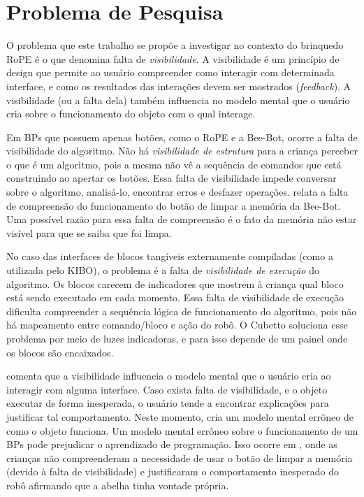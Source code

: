 \section{Problema de Pesquisa} \label{s_cintro_problema_pesquisa}

O problema que este trabalho se propõe a investigar no contexto do brinquedo RoPE é o que  denomina falta de \textit{visibilidade}. A visibilidade é um princípio de design que permite ao usuário compreender como interagir com determinada interface, e como os resultados das interações devem ser mostrados (\textit{feedback}). A visibilidade (ou a falta dela) também influencia no modelo mental que o usuário cria sobre o funcionamento do objeto com o qual interage.

Em BPs que possuem apenas botões, como o RoPE e a Bee-Bot, ocorre a falta de visibilidade do algoritmo. Não há \textit{visibilidade de estrutura} para a criança perceber o que é um algoritmo, pois a mesma não vê a sequência de comandos que está construindo ao apertar os botões. Essa falta de visibilidade impede conversar sobre o algoritmo, analisá-lo, encontrar erros e desfazer operações.  relata a falta de compreensão do funcionamento do botão de limpar a memória da Bee-Bot. Uma possível razão para essa falta de compreensão é o fato da memória não estar visível para que se saiba que foi limpa.

No caso das interfaces de blocos tangíveis externamente compiladas (como a utilizada pelo KIBO), o problema é a falta de \textit{visibilidade de execução} do algoritmo. Os blocos carecem de indicadores que mostrem à criança qual bloco está sendo executado em cada momento. Essa falta de visibilidade de execução dificulta compreender a sequência lógica de funcionamento do algoritmo, pois não há mapeamento entre comando/bloco e ação do robô. O Cubetto soluciona esse problema por meio de luzes indicadoras, e para isso depende de um painel onde os blocos são encaixados.

 comenta que a visibilidade influencia o modelo mental que o usuário cria ao interagir com alguma interface. Caso exista falta de visibilidade, e o objeto executar de forma inesperada, o usuário tende a encontrar explicações para justificar tal comportamento. Neste momento, cria um modelo mental errôneo de como o objeto funciona. Um modelo mental errôneo sobre o funcionamento de um BPs pode prejudicar o aprendizado de programação. Isso ocorre em , onde as crianças não compreenderam a necessidade de usar o botão de limpar a memória (devido à falta de visibilidade) e justificaram o comportamento inesperado do robô afirmando que a abelha tinha vontade própria.

